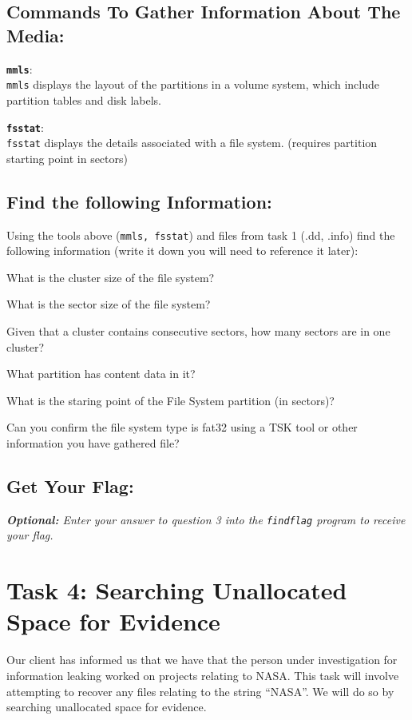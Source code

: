 \documentclass[a4paper,11pt]{article}
\begin{document}
\subsection*{Commands To Gather Information About The Media:}
\begin{itemize*}
	\item \textbf{\texttt{mmls}}:\\ \texttt{mmls} displays the layout of the partitions in a volume system, which include partition tables and disk labels.
	\item \textbf{\texttt{fsstat}}:\\ \texttt{fsstat} displays the details associated with a file system. (requires partition starting point in sectors)
\end{itemize*}

\subsection*{Find the following Information:}
Using the tools above (\texttt{mmls, fsstat}) and files from task 1 (.dd, .info) find the following information (write it down you will need to reference it later):
\begin{enumerate*}
	\item What is the cluster size of the file system?
	\item What is the sector size of the file system?
	\item Given that a cluster contains consecutive sectors, how many sectors are in one cluster?
	\item What partition has content data in it?
	\item What is the staring point of the File System partition (in sectors)?
	\item Can you confirm the file system type is fat32 using a TSK tool or other information you have gathered file?
\end{enumerate*}

\subsection*{Get Your Flag:}
\noindent
\textit{\textbf{Optional:} Enter your answer to question 3 into the \texttt{findflag} program to receive your flag.}

\section{Task 4: Searching Unallocated Space for Evidence}
Our client has informed us that we have that the person under investigation for information leaking worked on projects relating to NASA. This task will involve attempting to recover any files relating to the string ``NASA''. We will do so by searching unallocated space for evidence.
\end{document}
